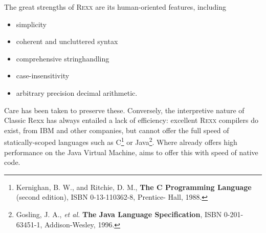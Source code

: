 
The great strengths of R\textsc{exx} are its human-oriented features, including
\begin{itemize}
\item simplicity
\item coherent and uncluttered syntax
\item comprehensive stringhandling
\item case-insensitivity
\item arbitrary precision decimal arithmetic.
\end{itemize}
Care has been taken to preserve these. Conversely, the interpretive
nature of Classic Rexx has always entailed a lack of efficiency: excellent R\textsc{exx}
compilers do exist, from IBM and other companies, but cannot offer the
full speed of statically-scoped languages such as
C\footnote{Kernighan, B. W., and Ritchie, D. M., \textbf{The C
    Programming Language} (second edition), ISBN 0-13-110362-8,
  Prentice- Hall, 1988.} or Java\footnote{Gosling, J. A., \emph{et
    al.} \textbf{The Java Language Specification}, ISBN 0-201-63451-1,
  Addison-Wesley, 1996.}. Where \nr{} already offers high performance
on the Java Virtual Machine, \crexx{} aims to offer this with speed of
native code.


